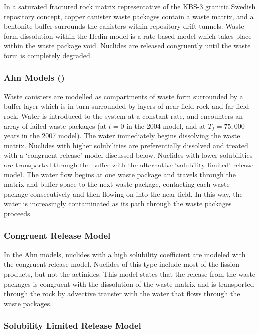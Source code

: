In a saturated fractured rock matrix representative of the KBS-3 granitic
Swedish repository concept, copper canister waste packages contain a waste
matrix, and a bentonite buffer surrounds the canisters within repository drift
tunnels. Waste form dissolution within the Hedin model is a rate based model
which takes place within the waste package void. Nuclides are released
congruently until the waste form is completely degraded.
\cite{hedin_integrated_2002} 

\subsubsection{Ahn Models (\cite{ahn_environmental_2004,
ahn_environmental_2007})}

Waste canisters are modelled as compartments of waste form surrounded by a
buffer layer which is in turn surrounded by layers of near field rock and far
field rock. Water is introduced to the system at a constant rate, and
encounters an array of failed waste packages (at $t=0$ in the 2004 model, and
at $T_f=75,000$ years in the 2007 model). The water immediately begins
dissolving the waste matrix.  Nuclides with higher solubilities are
preferentially dissolved and treated with a `congruent release' model discussed
below. Nuclides with lower solubilities are transported through the buffer with
the alternative `solubility limited' release model. The water flow begins at
one waste package and travels through the matrix and buffer space to the next
waste package, contacting each waste package consecutively and then flowing on
into the near field. In this way, the water is increasingly contaminated as its
path through the waste packages proceeds.  

\subsubsection{Congruent Release Model} 

In the Ahn models, nuclides with a high solubility coefficient are modeled with
the congruent release model.  Nuclides of this type include most of the fission
products, but not the actinides. This model states that the release from the
waste packages is congruent with the dissolution of the waste matrix and is
transported through the rock by advective transfer with the water that flows
through the waste packages.  

\subsubsection{Solubility Limited Release Model}

